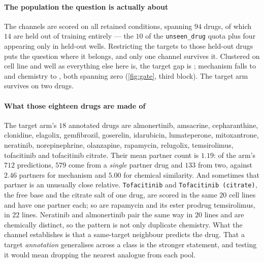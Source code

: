 \paragraph{The population the question is actually about} The channels are scored
on all retained conditions, spanning $94$ drugs, of which $14$ are held out of
training entirely --- the $10$ of the \texttt{unseen\_drug} quota plus four
appearing only in held-out wells. Restricting the targets to those held-out drugs
puts the question where it belongs, and only one channel survives it. Clustered
on cell line and well as everything else here is, the target gap is
; mechanism falls to
 and chemistry to ,
both spanning zero (\cref{fig:gate}, third block). The target arm survives on two
drugs.

\paragraph{What those eighteen drugs are made of} The target arm's $18$ annotated
drugs are almonertinib, amsacrine, cepharanthine, clonidine, elagolix,
gemfibrozil, goserelin, idarubicin, lumateperone, mitoxantrone, neratinib,
norepinephrine, olanzapine, rapamycin, relugolix, temsirolimus, tofacitinib and
tofacitinib citrate. Their mean partner count is $1.19$: of the arm's $712$
predictions, $579$ come from a \emph{single} partner drug and $133$ from two,
against $2.46$ partners for mechanism and $5.00$ for chemical similarity. And
sometimes that partner is an unusually close relative. \texttt{Tofacitinib} and
\texttt{Tofacitinib (citrate)}, the free base and the citrate salt of one drug,
are scored in the same $20$ cell lines and have one partner each; so are rapamycin
and its ester prodrug temsirolimus, in $22$ lines. Neratinib and almonertinib pair
the same way in $20$ lines and are chemically distinct, so the pattern is not only
duplicate chemistry. What the channel establishes is that a same-target neighbour
predicts the drug. That a target \emph{annotation} generalises across a class is
the stronger statement, and testing it would mean dropping the nearest analogue
from each pool.

